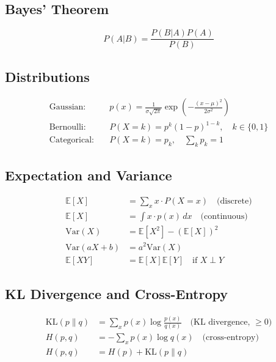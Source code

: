 \subsection{Bayes' Theorem}

\begin{equation}
P(A|B) = \frac{P(B|A)P(A)}{P(B)}
\end{equation}

\subsection{Distributions}

\begin{align}
\text{Gaussian:} \quad & p(x) = \frac{1}{\sigma\sqrt{2\pi}} \exp\left(-\frac{(x-\mu)^2}{2\sigma^2}\right) \\
\text{Bernoulli:} \quad & P(X=k) = p^k(1-p)^{1-k}, \quad k \in \{0, 1\} \\
\text{Categorical:} \quad & P(X=k) = p_k, \quad \sum_{k} p_k = 1
\end{align}

\subsection{Expectation and Variance}

\begin{align}
\mathbb{E}[X] &= \sum_x x \cdot P(X=x) \quad \text{(discrete)} \\
\mathbb{E}[X] &= \int x \cdot p(x) \, dx \quad \text{(continuous)} \\
\text{Var}(X) &= \mathbb{E}[X^2] - (\mathbb{E}[X])^2 \\
\text{Var}(aX + b) &= a^2 \text{Var}(X) \\
\mathbb{E}[XY] &= \mathbb{E}[X]\mathbb{E}[Y] \quad \text{if } X \perp Y
\end{align}

\subsection{KL Divergence and Cross-Entropy}

\begin{align}
\text{KL}(p \| q) &= \sum_x p(x)\log\frac{p(x)}{q(x)} \quad \text{(KL divergence, $\geq 0$)} \\
H(p, q) &= -\sum_x p(x)\log q(x) \quad \text{(cross-entropy)} \\
H(p, q) &= H(p) + \text{KL}(p \| q)
\end{align}

